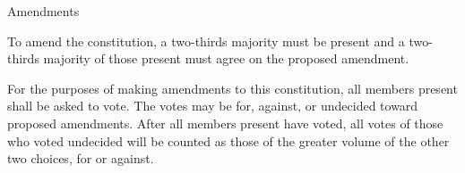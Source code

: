 {
\begin{article}{Amendments}
	\item To amend the constitution, a two-thirds majority must be present and a two-thirds majority of those present must agree on the proposed amendment.
	\item For the purposes of making amendments to this constitution, all members present shall be asked to vote.  The votes may be for, against, or undecided toward proposed amendments. After all members present have voted, all votes of those who voted undecided will be counted as those of the greater volume of the other two choices, for or against.
\end{article}
}